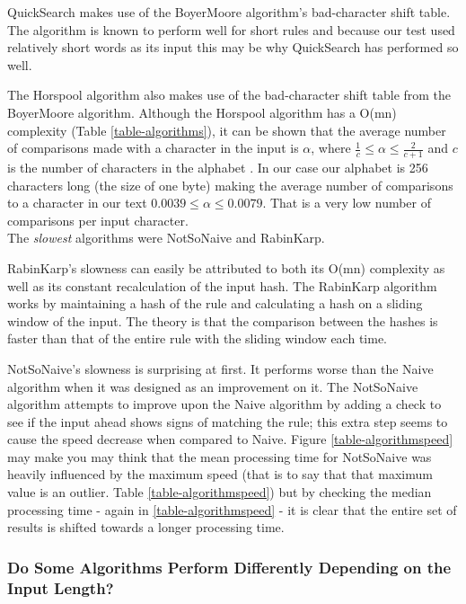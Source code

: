 \documentclass[11pt]{article}
\begin{document}
QuickSearch \citep{sunday1990} makes use of the BoyerMoore \citep{boyer1977} algorithm's bad-character shift table. The algorithm is known to perform well for short rules \citep{leqroc1995} and because our test used relatively short words as its input this may be why QuickSearch has performed so well.

The Horspool \citep{horspool1980} algorithm also makes use of the bad-character shift table from the BoyerMoore \citep{boyer1977} algorithm. Although the Horspool algorithm has a O(mn) complexity (Table \ref{table-algorithms}), it can be shown that the average number of comparisons made with a character in the input is $\alpha$, where $\frac{1}{c} \leq \alpha \leq \frac{2}{c+1}$ and $c$ is the number of characters in the alphabet \citep{baezayates1992b}. In our case our alphabet is 256 characters long (the size of one byte) making the average number of comparisons to a character in our text $0.0039 \leq \alpha \leq 0.0079$. That is a very low number of comparisons per input character.\\

The \textit{slowest} algorithms were NotSoNaive and RabinKarp.

RabinKarp's \citep{karp1987} slowness can easily be attributed to both its O(mn) complexity as well as its constant recalculation of the input hash. The RabinKarp algorithm works by maintaining a hash of the rule and calculating a hash on a sliding window of the input. The theory is that the comparison between the hashes is faster than that of the entire rule with the sliding window each time.

NotSoNaive's \citep{hancart1993} slowness is surprising at first. It performs worse than the Naive algorithm when it was designed as an improvement on it. The NotSoNaive algorithm attempts to improve upon the Naive algorithm by adding a check to see if the input ahead shows signs of matching the rule; this extra step seems to cause the speed decrease when compared to Naive. Figure \ref{table-algorithmspeed} may make you may think that the mean processing time for NotSoNaive was heavily influenced by the maximum speed (that is to say that that maximum value is an outlier. Table \ref{table-algorithmspeed}) but by checking the median processing time - again in \ref{table-algorithmspeed} - it is clear that the entire set of results is shifted towards a longer processing time.

\subsubsection{Do Some Algorithms Perform Differently Depending on the Input Length?}
\end{document}
